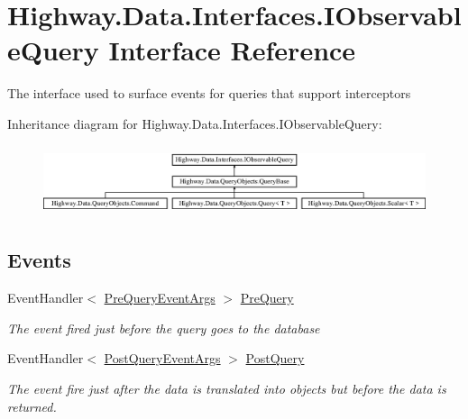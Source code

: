 \hypertarget{interface_highway_1_1_data_1_1_interfaces_1_1_i_observable_query}{\section{Highway.\-Data.\-Interfaces.\-I\-Observable\-Query Interface Reference}
\label{interface_highway_1_1_data_1_1_interfaces_1_1_i_observable_query}
}


The interface used to surface events for queries that support interceptors  


Inheritance diagram for Highway.\-Data.\-Interfaces.\-I\-Observable\-Query\-:\begin{figure}[H]
\begin{center}
\leavevmode
\includegraphics[height=2.089552cm]{interface_highway_1_1_data_1_1_interfaces_1_1_i_observable_query}
\end{center}
\end{figure}
\subsection*{Events}
\begin{DoxyCompactItemize}
\item 
Event\-Handler$<$ \hyperlink{class_highway_1_1_data_1_1_interceptors_1_1_events_1_1_pre_query_event_args}{Pre\-Query\-Event\-Args} $>$ \hyperlink{interface_highway_1_1_data_1_1_interfaces_1_1_i_observable_query_a1687e8dccf74ef87f98fe8ef6f1c99c3}{Pre\-Query}
\begin{DoxyCompactList}\small\item\em The event fired just before the query goes to the database \end{DoxyCompactList}\item 
Event\-Handler$<$ \hyperlink{class_highway_1_1_data_1_1_interceptors_1_1_events_1_1_post_query_event_args}{Post\-Query\-Event\-Args} $>$ \hyperlink{interface_highway_1_1_data_1_1_interfaces_1_1_i_observable_query_ac8cff5ce936c3611f965796ba9707c49}{Post\-Query}
\begin{DoxyCompactList}\small\item\em The event fire just after the data is translated into objects but before the data is returned. \end{DoxyCompactList}\end{DoxyCompactItemize}


